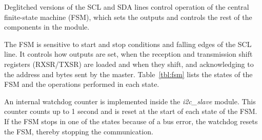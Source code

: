 \documentclass[a4paper,11pt]{article}
\begin{document}
Deglitched versions of the SCL and SDA lines control operation of the central finite-state
machine (FSM), which sets the outputs and controls the rest of the components in the module.

The FSM is sensitive to start and stop conditions and falling edges of the SCL line. It
controls how outputs are set, when the reception and transmission shift registers (RXSR/TXSR)
are loaded and when they shift, and acknowledging to the address and bytes sent by the
master. Table~\ref{tbl:fsm} lists the states of the FSM and the operations performed
in each state.

An internal watchdog counter is implemented inside the \textit{i2c\_slave} module. This counter
counts up to 1 second and is reset at the start of each state of the FSM. If the FSM stops
in one of the states because of a bus error, the watchdog resets the FSM, thereby stopping the
communication.
\end{document}
